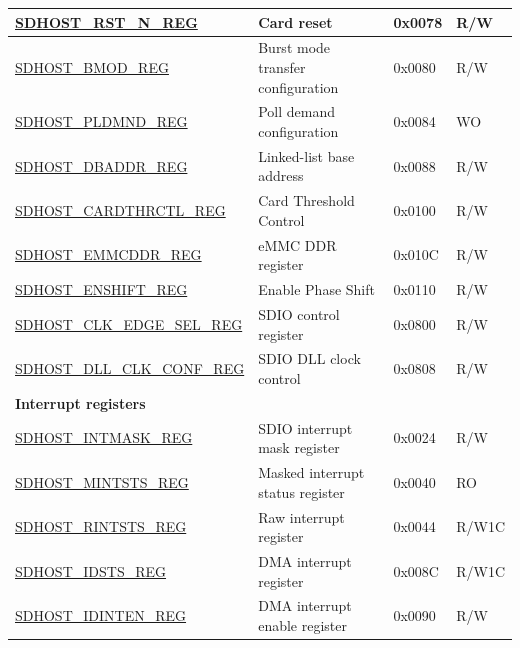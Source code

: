 \begin{longtable}{ | p{6cm} | p{7.0cm} | p{1.3cm} | p{1.2cm} | }
\hyperref[regdesc:SDHOSTRSTNREG]{SDHOST\_RST\_N\_REG} & Card reset & 0x0078 & R/W \\ \hline
\hyperref[regdesc:SDHOSTBMODREG]{SDHOST\_BMOD\_REG} & Burst mode transfer configuration & 0x0080 & R/W \\ \hline
\hyperref[regdesc:SDHOSTPLDMNDREG]{SDHOST\_PLDMND\_REG} & Poll demand configuration & 0x0084 & WO \\ \hline
\hyperref[regdesc:SDHOSTDBADDRREG]{SDHOST\_DBADDR\_REG} & Linked-list base address & 0x0088 & R/W \\ \hline
\hyperref[regdesc:SDHOSTCARDTHRCTLREG]{SDHOST\_CARDTHRCTL\_REG} & Card Threshold Control & 0x0100 & R/W \\ \hline
\hyperref[regdesc:SDHOSTEMMCDDRREG]{SDHOST\_EMMCDDR\_REG} & eMMC DDR register & 0x010C & R/W \\ \hline
\hyperref[regdesc:SDHOSTENSHIFTREG]{SDHOST\_ENSHIFT\_REG} & Enable Phase Shift & 0x0110 & R/W \\ \hline
\hyperref[regdesc:SDHOSTCLKEDGESELREG]{SDHOST\_CLK\_EDGE\_SEL\_REG} & SDIO control register & 0x0800 & R/W \\ \hline
\hyperref[regdesc:SDHOSTDLLCLKCONFREG]{SDHOST\_DLL\_CLK\_CONF\_REG} & SDIO DLL clock control & 0x0808 & R/W \\ \hline

\multicolumn{4}{|l|}{\textbf{Interrupt registers}} \\ \hline
\hyperref[regdesc:SDHOSTINTMASKREG]{SDHOST\_INTMASK\_REG} & SDIO interrupt mask register & 0x0024 & R/W \\ \hline
\hyperref[regdesc:SDHOSTMINTSTSREG]{SDHOST\_MINTSTS\_REG} & Masked interrupt status register & 0x0040 & RO \\ \hline
\hyperref[regdesc:SDHOSTRINTSTSREG]{SDHOST\_RINTSTS\_REG} & Raw interrupt register & 0x0044 & R/W1C \\ \hline
\hyperref[regdesc:SDHOSTIDSTSREG]{SDHOST\_IDSTS\_REG} & DMA interrupt register & 0x008C & R/W1C \\ \hline
\hyperref[regdesc:SDHOSTIDINTENREG]{SDHOST\_IDINTEN\_REG} & DMA interrupt enable register & 0x0090 & R/W \\ \hline


\end{longtable}
